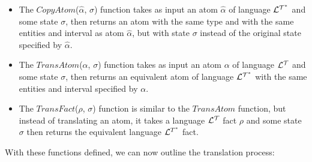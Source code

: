 \documentclass[11pt]{report}
\begin{document}
          \begin{itemize}
            \item
              The $CopyAtom$($\hat{\alpha}$, $\sigma$) function takes as input
              an atom $\hat{\alpha}$ of language ${\cal L^{T^*}}$ and some
              state $\sigma$, then returns an atom with the same type and with
              the same entities and interval as atom $\hat{\alpha}$, but with
              state $\sigma$ instead of the original state specified by
              $\hat{\alpha}$.

            \item
              The $TransAtom$($\alpha$, $\sigma$) function takes as input an
              atom $\alpha$ of language ${\cal L^T}$ and some state $\sigma$,
              then returns an equivalent atom of language ${\cal L^{T^*}}$
              with the same entities and interval specified by $\alpha$.

            \item
              The $TransFact$($\rho$, $\sigma$) function is similar to the
              $TransAtom$ function, but instead of translating an atom, it
              takes a language ${\cal L^T}$ fact $\rho$ and some state $\sigma$
              then returns the equivalent language ${\cal L}^{T^*}$ fact.
          \end{itemize}

          With these functions defined, we can now outline the translation
          process:
\end{document}
